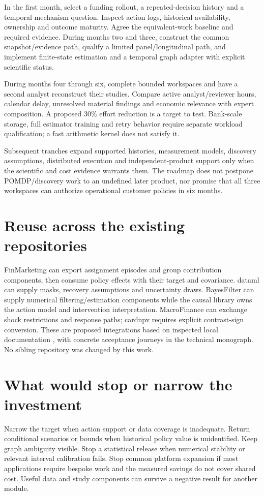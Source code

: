 \documentclass[11pt,a4paper,openany]{book}
\begin{document}
In the first month, select a funding rollout, a repeated-decision history
and a temporal mechanism question. Inspect action logs, historical
availability, ownership and outcome maturity. Agree the equivalent-work
baseline and required evidence. During months two and three, construct the
common snapshot/evidence path, qualify a limited panel/longitudinal path,
and implement finite-state estimation and a temporal graph adapter with
explicit scientific status.

During months four through six, complete bounded workspaces and have a
second analyst reconstruct their studies. Compare active analyst/reviewer
hours, calendar delay, unresolved material findings and economic relevance
with expert composition. A proposed 30\% effort reduction is a target to
test. Bank-scale storage, full estimator training and retry behavior require
separate workload qualification; a fast arithmetic kernel does not satisfy it.

Subsequent tranches expand supported histories, measurement models,
discovery assumptions, distributed execution and independent-product support
only when the scientific and cost evidence warrants them. The roadmap does
not postpone POMDP/discovery work to an undefined later product, nor promise
that all three workspaces can authorize operational customer policies in
six months.

\section*{Reuse across the existing repositories}
FinMarketing can export assignment episodes and group contribution components,
then consume policy effects with their target and covariance. dataml can
supply masks, recovery assumptions and uncertainty draws. BayesFilter can
supply numerical filtering/estimation components while the causal library
owns the action model and intervention interpretation. MacroFinance can
exchange shock restrictions and response paths; cardnpv requires explicit
contrast-sign conversion. These are proposed integrations based on inspected
local documentation \citep{localrepos}, with concrete acceptance journeys
in the technical monograph. No sibling repository was changed by this work.

\section*{What would stop or narrow the investment}
Narrow the target when action support or data coverage is inadequate.
Return conditional scenarios or bounds when historical policy value is
unidentified. Keep graph ambiguity visible. Stop a statistical release when
numerical stability or relevant interval calibration fails. Stop common
platform expansion if most applications require bespoke work and the
measured savings do not cover shared cost. Useful data and study components
can survive a negative result for another module.
\end{document}
